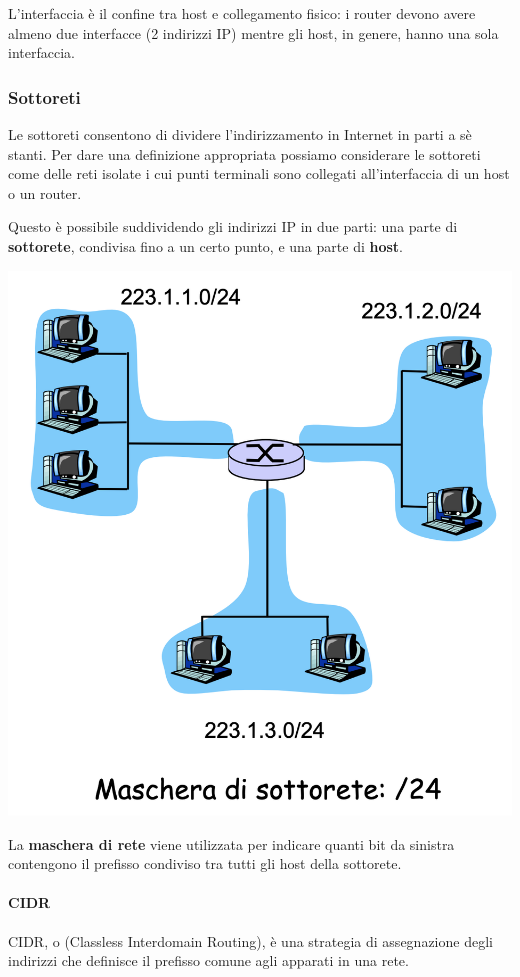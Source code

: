 \documentclass{report}
\begin{document}
L'interfaccia è il confine tra host e collegamento fisico: i router
devono avere almeno due interfacce (2 indirizzi IP) mentre gli host, in
genere, hanno una sola interfaccia.

\hypertarget{header-n100}{%
\subsubsection{Sottoreti}\label{header-n100}}

Le sottoreti consentono di dividere l'indirizzamento in Internet in
parti a sè stanti. Per dare una definizione appropriata possiamo
considerare le sottoreti come delle reti isolate i cui punti terminali
sono collegati all'interfaccia di un host o un router.

Questo è possibile suddividendo gli indirizzi IP in due parti: una parte
di \textbf{sottorete}, condivisa fino a un certo punto, e una parte di
\textbf{host}.

\begin{center}
		\includegraphics[width=0.7\linewidth]{subnet}
	\end{center}

La \textbf{maschera di rete} viene utilizzata per indicare quanti bit da
sinistra contengono il prefisso condiviso tra tutti gli host della
sottorete.

\hypertarget{header-n105}{%
\paragraph{CIDR}\label{header-n105}}

CIDR, o (Classless Interdomain Routing), è una strategia di assegnazione
degli indirizzi che definisce il prefisso comune agli apparati in una
rete.
\end{document}
